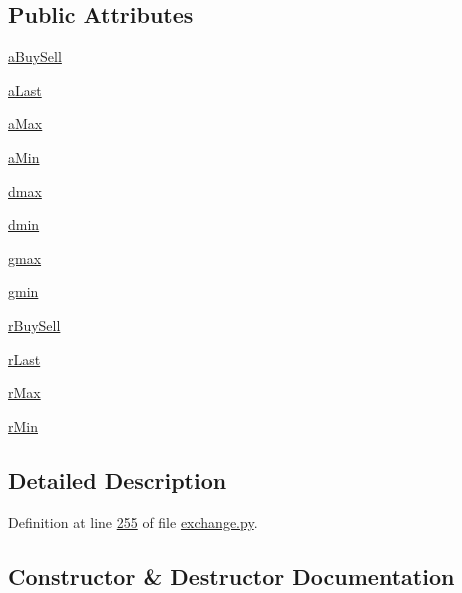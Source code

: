 \subsection*{Public Attributes}
\begin{DoxyCompactItemize}
\item 
\hyperlink{classexchange_1_1_diff_tracker_ae6108d1ec0cdf3b195ed5bb7c8b529b2}{a\+Buy\+Sell}
\item 
\hyperlink{classexchange_1_1_diff_tracker_ae428ab91ae6471c4ad8b566540fb035e}{a\+Last}
\item 
\hyperlink{classexchange_1_1_diff_tracker_a3dcbc689ebb5ec6e0c8e600079d95de9}{a\+Max}
\item 
\hyperlink{classexchange_1_1_diff_tracker_a65d042348359fa27a17e092e66405ae7}{a\+Min}
\item 
\hyperlink{classexchange_1_1_diff_tracker_a8ee4999d420f124afa67ff2b131bbce5}{dmax}
\item 
\hyperlink{classexchange_1_1_diff_tracker_a0a1bbdbeeee705d2448d69e98f77a14c}{dmin}
\item 
\hyperlink{classexchange_1_1_diff_tracker_a73f20240fb1d81a320a6f78aec022529}{gmax}
\item 
\hyperlink{classexchange_1_1_diff_tracker_a8c2277408ff52d5bb8913a98f4efe8b0}{gmin}
\item 
\hyperlink{classexchange_1_1_diff_tracker_aab406fe7b4dc6d486c4a9fb65944a4df}{r\+Buy\+Sell}
\item 
\hyperlink{classexchange_1_1_diff_tracker_a4dbaf0a1192448101cb35eca617c7f0f}{r\+Last}
\item 
\hyperlink{classexchange_1_1_diff_tracker_ab4266c6d4fc968997e26044a7c827980}{r\+Max}
\item 
\hyperlink{classexchange_1_1_diff_tracker_ad3250cb94933244444942dec9199d362}{r\+Min}
\end{DoxyCompactItemize}


\subsection{Detailed Description}


Definition at line \hyperlink{exchange_8py_source_l00255}{255} of file \hyperlink{exchange_8py_source}{exchange.\+py}.



\subsection{Constructor \& Destructor Documentation}

